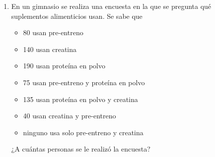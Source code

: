 \documentclass[11pt, twoside]{book}%
\begin{document}
\begin{enumerate}
    \item En un gimnasio se realiza una encuesta en la que se pregunta qué suplementos alimenticios usan. 
        Se sabe que
        \begin{multicols}{2}
        \begin{itemize}[label=\(\bullet\)]
            \item 80 usan pre-entreno
            \item 140 usan creatina
            \item 190 usan proteína en polvo
            \item 75 usan pre-entreno y proteína en polvo
            \item 135 usan proteína en polvo y creatina
            \item 40 usan creatina y pre-entreno
            \item ninguno usa solo pre-entreno y creatina
        \end{itemize}
    \end{multicols}
    ¿A cuántas personas se le realizó la encuesta?

\end{enumerate}
\end{document}
